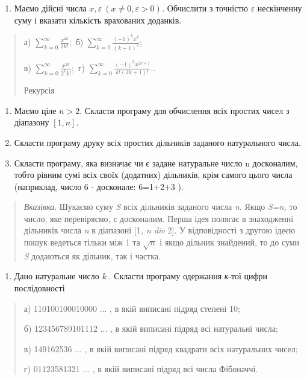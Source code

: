 \documentclass[]{article}
\begin{document}
\begin{enumerate}
\def\labelenumi{\arabic{enumi})}
\item
  Маємо дійсні числа
  \(x,\varepsilon\ (x \neq 0,\varepsilon > 0)\)\emph{.} Обчислити з
  точністю \(\varepsilon\) нескінченну суму і вказати кількість
  врахованих доданків.
\end{enumerate}

\begin{quote}
а) \(\sum_{k = 0}^{\infty}\frac{x^{2k}}{2k!};\) б)
\(\sum_{k = 0}^{\infty}\frac{( - 1)^{k}x^{k}}{(k + 1)^{2}};\)

в) \(\sum_{k = 0}^{\infty}\frac{x^{2k}}{2^{k}k!};\) г)
\(\sum_{k = 0}^{\infty}\frac{( - 1)^{k}x^{2k + 1}}{k!(2k + 1)!}.\).

Рекурсія
\end{quote}

\begin{enumerate}
\def\labelenumi{\arabic{enumi})}
\item
  Маємо ціле \(n > 2\). Скласти програму для обчислення всіх простих
  чисел з діапазону \(\left\lbrack 1,n \right\rbrack.\)
\item
  Скласти програму друку всіх простих дільників заданого натурального
  числа.
\item
  Скласти програму, яка визначає чи є задане натуральне число n
  досконалим, тобто рівним сумі всіх своїх (додатних) дільників, крім
  самого цього числа (наприклад, число 6 - досконале: 6=1+2+3 ).
\end{enumerate}

\begin{quote}
\emph{Вказівка}. Шукаємо суму \emph{S} всіх дільників заданого числа
\emph{n}. Якщо \emph{S=n,} то число, яке перевіряємо, є досконалим.
Перша ідея полягає в знаходженні дільників числа \emph{n} в діапазоні
{[}1\emph{, n div} 2{]}. У відповідності з другою ідеєю пошук ведеться
тільки між 1 та \(\sqrt{n}\) і якщо дільник знайдений, то до суми
\emph{S} додаються як дільник, так і частка.
\end{quote}

\begin{enumerate}
\def\labelenumi{\arabic{enumi})}
\item
  Дано натуральне число \emph{k} . Скласти програму одержання
  \emph{к}-тої цифри послідовності
\end{enumerate}

\begin{quote}
а) 110100100010000 ... , в якій виписані підряд степені 10;

б) 123456789101112 ... , в якій виписані підряд всі натуральні числа;

в) 149162536 ... , в якій виписані підряд квадрати всіх натуральних
чисел;

г) 01123581321 ... , в якій виписані підряд всі числа Фібоначчі.
\end{quote}
\end{document}
